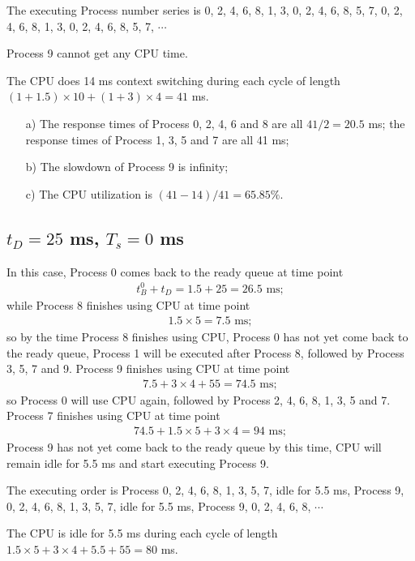\documentclass[12pt,letterpaper]{article}
\begin{document}
The executing Process number series is 0, 2, 4, 6, 8, 1, 3, 0, 2, 4, 6, 8, 5, 7, 0, 2, 4, 6, 8, 1, 3, 0, 2, 4, 6, 8, 5, 7, $\cdots$

Process 9 cannot get any CPU time.

The CPU does 14 ms context switching during each cycle of length $(1+1.5)\times10+(1+3)\times4=41$ ms.

\begin{enumerate}
\item[a)] The response times of Process 0, 2, 4, 6 and 8 are all $41/2=20.5$ ms; the response times of Process 1, 3, 5 and 7 are all 41 ms;
\item[b)] The slowdown of Process 9 is infinity;
\item[c)] The CPU utilization is $(41-14)/41=65.85\%$.
\end{enumerate}

\subsection{$t_D=25$ ms, $T_s = 0$ ms}
In this case, Process 0 comes back to the ready queue at time point
\begin{eqnarray}
t_B^0+t_D=1.5+25=26.5\textrm{ ms};
\end{eqnarray}
while Process 8 finishes using CPU at time point 
\begin{eqnarray}
1.5\times5=7.5\textrm{ ms};
\end{eqnarray}
so by the time Process 8 finishes using CPU, Process 0 has not yet come back to the ready queue, Process 1 will be executed after Process 8, followed by Process 3, 5, 7 and 9. Process 9 finishes using CPU at time point
\begin{eqnarray}
7.5+3\times4+55=74.5\textrm{ ms};
\end{eqnarray}
so Process 0 will use CPU again, followed by Process 2, 4, 6, 8, 1, 3, 5 and 7. Process 7 finishes using CPU at time point
\begin{eqnarray}
74.5+1.5\times5+3\times4=94\textrm{ ms};
\end{eqnarray}
Process 9 has not yet come back to the ready queue by this time, CPU will remain idle for 5.5 ms and start executing Process 9.

The executing order is Process 0, 2, 4, 6, 8, 1, 3, 5, 7, idle for 5.5 ms, Process 9, 0, 2, 4, 6, 8, 1, 3, 5, 7, idle for 5.5 ms, Process 9, 0, 2, 4, 6, 8, $\cdots$

The CPU is idle for 5.5 ms during each cycle of length $1.5\times5+3\times4+5.5+55=80$ ms.
\end{document}
